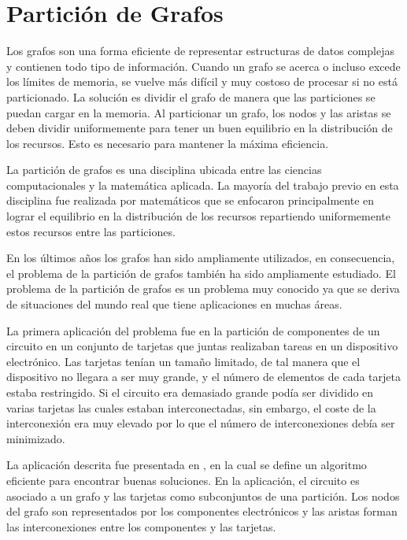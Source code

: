 \section{Partición de Grafos}

Los grafos son una forma eficiente de representar estructuras de datos complejas y contienen todo tipo de información. Cuando un grafo se acerca o incluso excede los límites de memoria, se vuelve más difícil y muy costoso de procesar si no está particionado. La solución es dividir el grafo de manera que las particiones se puedan cargar en la memoria. Al particionar un grafo, los nodos y las aristas se deben dividir uniformemente para tener un buen equilibrio en la distribución de los recursos. Esto es necesario para mantener la máxima eficiencia.

La partición de grafos es una disciplina ubicada entre las ciencias computacionales y la matemática aplicada. La mayoría del trabajo previo en esta disciplina fue realizada por matemáticos que se enfocaron principalmente en lograr el equilibrio en la distribución de los recursos repartiendo uniformemente estos recursos entre las particiones.

En los últimos años los grafos han sido ampliamente utilizados, en consecuencia, el problema de la partición de grafos también ha sido ampliamente estudiado. El problema de la partición de grafos es un problema muy conocido ya que se deriva de situaciones del mundo real que tiene aplicaciones en muchas áreas. 

La primera aplicación del problema fue en la partición de componentes de un circuito en un conjunto de tarjetas que juntas realizaban tareas en un dispositivo electrónico. Las tarjetas tenían un tamaño limitado, de tal manera que el dispositivo no llegara a ser muy grande, y el número de elementos de cada tarjeta estaba restringido. Si el circuito era demasiado grande podía ser dividido en varias tarjetas las cuales estaban interconectadas, sin embargo, el coste de la interconexión era muy elevado por lo que el número de interconexiones debía ser minimizado.

La aplicación descrita fue presentada en \cite{KernighanLin}, en la cual se define un algoritmo eficiente para encontrar buenas soluciones. En la aplicación, el circuito es asociado a un grafo y las tarjetas como subconjuntos de una partición. Los nodos del grafo son representados por los componentes electrónicos y las aristas forman las interconexiones entre los componentes y las tarjetas.

